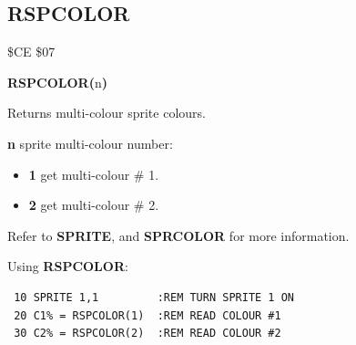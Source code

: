 \subsection{RSPCOLOR}
\begin{description}[leftmargin=2cm,style=nextline]
\item [Token:] \$CE \$07
\item [Format:] {\bf RSPCOLOR(}n{\bf)}
\item [Usage:]  Returns multi-colour sprite colours.

                {\bf n} sprite multi-colour number:

                \begin{itemize}
                    \item {\bf 1} get multi-colour \# 1.
                    \item {\bf 2} get multi-colour \# 2.
                \end{itemize}

\item [Remarks:] Refer to {\bf SPRITE}, and {\bf SPRCOLOR} for more information.

\item [Example:] Using {\bf RSPCOLOR}:
\begin{tcolorbox}[colback=black,coltext=white]
\verbatimfont{\codefont}
\begin{verbatim}
 10 SPRITE 1,1         :REM TURN SPRITE 1 ON
 20 C1% = RSPCOLOR(1)  :REM READ COLOUR #1
 30 C2% = RSPCOLOR(2)  :REM READ COLOUR #2
\end{verbatim}
\end{tcolorbox}
\end{description}


\newpage
